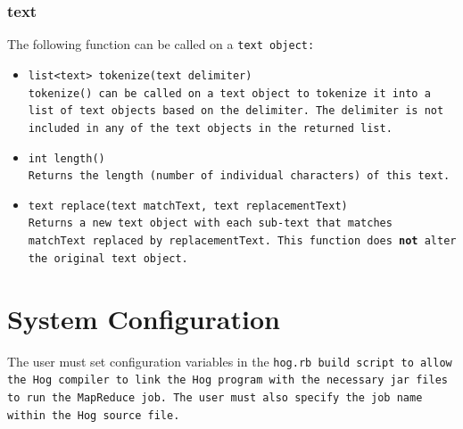 \documentclass{article}
\begin{document}

\subsubsection{text} %
\label{ssub:text}

The following function can be called on a \tt text \rm object:

\begin{itemize}

\item[] \tt list<text> tokenize(text delimiter) \rm \\

\tt tokenize() \rm can be called on a \tt text \rm object to tokenize it into a
list of \tt text \rm objects based on the delimiter. The delimiter is not included
in any of the \tt text \rm objects in the returned list.

\item[] \tt int length() \rm \\

Returns the length (number of individual characters) of this \tt text\rm.

\item[] \tt text replace(text matchText, text replacementText) \rm \\

Returns a new \tt text \rm object with each sub-\tt text \rm that matches \tt
matchText \rm replaced by \tt replacementText\rm. This function does \textbf{not}
alter the original \tt text \rm object.

\end{itemize}




\section{System Configuration} %
\label{sec:system_configuration}

The user must set configuration variables in the \tt hog.rb \rm build script to
allow the Hog compiler to link the Hog program with the necessary jar files to run
the MapReduce job. The user must also specify the job name within the Hog source
file.
\end{document}
